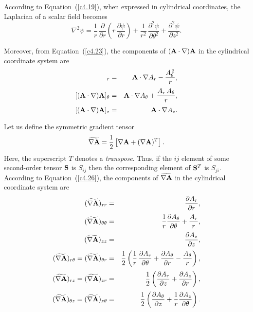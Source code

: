 According to Equation~(\ref{c4.19}), when expressed in cylindrical coordinates, the Laplacian of a scalar field becomes
\begin{equation}
\nabla^2 \psi = \frac{1}{r}\,\frac{\partial}{\partial r}\left(r\,\frac{\partial \psi}{\partial r}\right) + \frac{1}{r^2}\,\frac{\partial^2 \psi}{\partial\theta^2} + \frac{\partial^2 \psi}{\partial z^2}.
\end{equation} 

Moreover, from Equation~(\ref{c4.23}), the components of $({\bf A}\cdot\nabla){\bf A}$ in the cylindrical coordinate system are
\begin{eqnarray}
[({\bf A}\cdot\nabla){\bf A}]_r&=& {\bf A}\cdot\nabla A_r - \frac{A_\theta^{\,2}}{r},\\[0.5ex]
[({\bf A}\cdot\nabla){\bf A}]_\theta&=& {\bf A}\cdot\nabla A_\theta + \frac{A_r\,A_\theta}{r},\\[0.5ex]
[({\bf A}\cdot\nabla){\bf A}]_z&=& {\bf A}\cdot\nabla A_z.
\end{eqnarray}

Let us define the symmetric gradient  tensor
\begin{equation}
\widetilde{\nabla {\bf A}} = \frac{1}{2}\left[\nabla {\bf A} + (\nabla{\bf A})^T\right].
\end{equation}
Here, the superscript $T$ denotes a {\em transpose}. Thus, if the $ij$ element of some second-order tensor ${\bf S}$ is $S_{ij}$ then the
corresponding element of ${\bf S}^T$ is $S_{ji}$. 
According to Equation~(\ref{c4.26}), the components of $\widetilde{\nabla {\bf A}}$ in the cylindrical
coordinate system are 
\begin{eqnarray}
(\widetilde{\nabla {\bf A}})_{rr} &=& \frac{\partial A_r}{\partial r},\\[0.5ex]
(\widetilde{\nabla {\bf A}})_{\theta\theta} &=&\frac{1}{r} \frac{\partial A_\theta}{\partial \theta}+ \frac{A_r}{r},\\[0.5ex]
(\widetilde{\nabla {\bf A}})_{zz} &=& \frac{\partial A_z}{\partial z},\\[0.5ex]
(\widetilde{\nabla {\bf A}})_{r\theta}=(\widetilde{\nabla {\bf A}})_{\theta r} &=& \frac{1}{2}\left(\frac{1}{r}\,\frac{\partial A_r}{\partial\theta} + \frac{\partial A_\theta}{\partial r} - \frac{A_\theta}{r}\right),\\[0.5ex]
(\widetilde{\nabla {\bf A}})_{rz}=(\widetilde{\nabla {\bf A}})_{zr} &=&\frac{1}{2}\left(\frac{\partial A_r}{\partial z} + \frac{\partial A_z}{\partial r}\right),\\[0.5ex]
(\widetilde{\nabla {\bf A}})_{\theta z}=(\widetilde{\nabla {\bf A}})_{z\theta} &=&\frac{1}{2}\left(\frac{\partial A_\theta}{\partial z} + \frac{1}{r}\frac{\partial A_z}{\partial \theta}\right).
\end{eqnarray}

